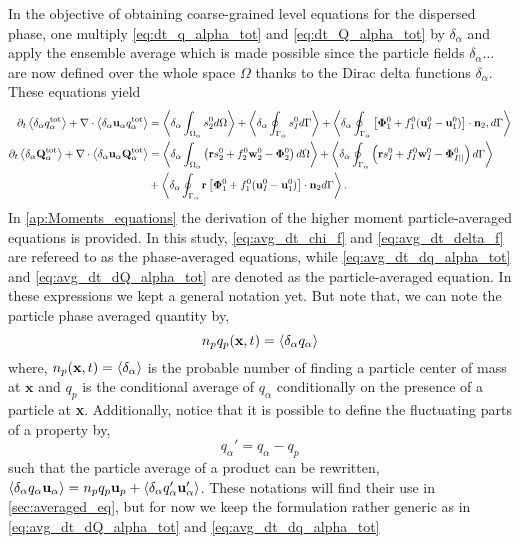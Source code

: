 In the objective of obtaining coarse-grained level equations for the dispersed phase, one multiply \ref{eq:dt_q_alpha_tot} and \ref{eq:dt_Q_alpha_tot} by $\delta_\alpha$ and apply the ensemble average which is made possible since the particle fields $\delta_\alpha \ldots$ are now defined over the whole space $\Omega$ thanks to the Dirac delta functions $\delta_\alpha$.  
These equations yield
\begin{align}
    \partial_t \left<\delta_\alpha  q_\alpha^\text{tot}\right>
    + \mathbf{\nabla}\cdot \left<\delta_\alpha\textbf{u}_\alpha q_\alpha^\text{tot}\right>
    &= \left<\delta_\alpha \int_{\Omega_\alpha}  s_2^0  d\Omega\right>
    + \left<\delta_\alpha \oint_{\Gamma_\alpha}  s_I^0  d\Gamma\right>
    + \left<\delta_\alpha \oint_{\Gamma_\alpha}  \left[\mathbf{\Phi}_1^0 + f_1^0 (\textbf{u}_I^0-\textbf{u}_1^0) \right] \cdot \textbf{n}_2 , d\Gamma\right>
    \label{eq:avg_dt_dq_alpha_tot}\\
    \partial_t \left<\delta_\alpha \textbf{Q}_\alpha^\text{tot}\right>
    + \mathbf{\nabla}\cdot \left<\delta_\alpha\textbf{u}_\alpha\textbf{Q}_\alpha^\text{tot}\right>
    &=\left<\delta_\alpha \int_{\Omega_\alpha}  \left(
        \textbf{r} s_2^0         
        + f_2^0  \textbf{w}_2^0 
        - \mathbf{\Phi}_2^0
    \right)  d\Omega\right>
    + \left<\delta_\alpha \oint_{\Gamma_\alpha}  \left(
        \textbf{r}s_I^0
        + f_I^0 \textbf{w}_I^0
        - \mathbf{\Phi}_{I||}^0
    \right)  d\Gamma\right>\nonumber\\
    &+ \left<\delta_\alpha \oint_{\Gamma_\alpha}  \textbf{r} \left[
        \mathbf{\Phi}_1^0
        + f_1^0 (\textbf{u}_I^0-\textbf{u}_1^0)
    \right]\cdot \textbf{n}_2   d\Gamma\right>.
    \label{eq:avg_dt_dQ_alpha_tot}
\end{align}
In \ref{ap:Moments_equations} the derivation of the higher moment particle-averaged equations is provided. 
In this study, \ref{eq:avg_dt_chi_f} and \ref{eq:avg_dt_delta_f} are refereed to as the phase-averaged equations, while \ref{eq:avg_dt_dq_alpha_tot} and \ref{eq:avg_dt_dQ_alpha_tot} are denoted as the particle-averaged equation. 
In these expressions we kept a general notation yet. 
But note that, we can note the particle phase averaged quantity by,
\begin{equation}
     n_p q_p(\textbf{x},t) = \left<\delta_\alpha q_\alpha\right>
     \label{eq:p_avg}
\end{equation}
where, $n_p(\textbf{x},t) = \left<\delta_\alpha\right>$ is the probable number of finding a particle center of mass at $\textbf{x}$
and $q_p$ is the conditional average of $q_\alpha$ conditionally on the presence of a particle at \textbf{x}. 
Additionally, notice that it is possible to define the fluctuating parts of a property by, 
\begin{equation}
    q_\alpha' = q_\alpha - q_p
\end{equation}
such that the particle average of a product can be rewritten, $\left<\delta_\alpha q_\alpha\textbf{u}_\alpha\right> = n_p q_p \textbf{u}_p + \left<\delta_\alpha q_\alpha' \textbf{u}_\alpha'\right>$. 
These notations will find their use in \ref{sec:averaged_eq}, but for now we keep the formulation rather generic as in \ref{eq:avg_dt_dQ_alpha_tot} and \ref{eq:avg_dt_dq_alpha_tot}

 



